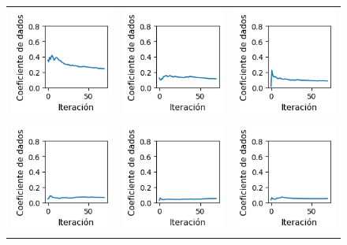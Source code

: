 \begin{figure}[!b]
    \centering
    \begin{tabular}{ccc}
        \includegraphics[width=4cm]{../Plots/dl_epoch_0.png} &
        \includegraphics[width=4cm]{../Plots/dl_epoch_1.png} &
        \includegraphics[width=4cm]{../Plots/dl_epoch_2.png} \\

        \includegraphics[width=4cm]{../Plots/dl_epoch_3.png} &
        \includegraphics[width=4cm]{../Plots/dl_epoch_4.png} &
        \includegraphics[width=4cm]{../Plots/dl_epoch_5.png} \\


\end{tabular}
\end{figure}
